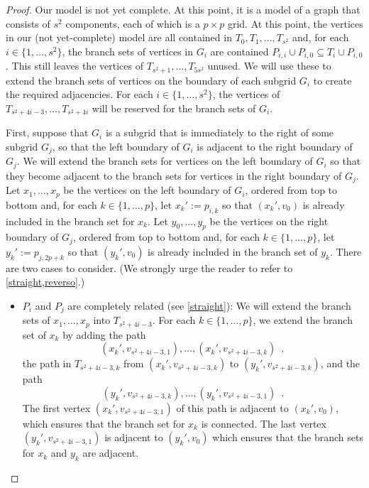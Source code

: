 \documentclass{patmorin}
\theoremstyle{plain}
\theoremstyle{definition}
\begin{document}
\begin{proof}
  Our model is not yet complete.  At this point, it is a model of a graph that consists of $s^2$ components, each of which is a $p\times p$ grid.  At this point, the vertices in our (not yet-complete) model are all contained in $T_0,T_1,\ldots,T_{s^2}$ and, for each $i\in\{1,\ldots,s^2\}$, the branch sets of vertices in $G_i$ are contained $P_{i,i}\cup P_{i,0}\subseteq T_{i}\cup P_{i,0}$.  This still leaves the vertices of $T_{s^2+1},\ldots,T_{5s^2}$ unused.  We will use these to extend the branch sets of vertices on the boundary of each subgrid $G_i$ to create the required adjacencies.  For each $i\in\{1,\ldots,s^2\}$, the vertices of $T_{s^2+4i-3},\ldots,T_{s^2+4i}$ will be reserved for the branch sets of $G_i$.

  First, suppose that $G_i$ is a subgrid that is immediately to the right of some subgrid $G_j$, so that the left boundary of $G_i$ is adjacent to the right boundary of $G_j$.  We will extend the branch sets for vertices on the left boundary of $G_i$ so that they become adjacent to the branch sets for vertices in the right boundary of $G_j$. Let $x_1,\ldots,x_p$ be the vertices on the left boundary of $G_i$, ordered from top to bottom and, for each $k\in\{1,\ldots,p\}$, let $x_k':=p_{i,k}$ so that $(x_k',v_0)$ is already included in the branch set for $x_k$.  Let $y_0,\ldots,y_p$ be the vertices on the right boundary of $G_j$, ordered from top to bottom and, for each $k\in\{1,\ldots,p\}$, let $y_k':=p_{j,2p+k}$ so that $(y_k',v_0)$ is already included in the branch set of $y_k$. There are two cases to consider.  (We strongly urge the reader to refer to \cref{straight,reverso}.)

\newpage

  \begin{itemize}
    \item $P_i$ and $P_j$ are completely related (see \cref{straight}): We will extend the branch sets of $x_1,\ldots,x_p$ into $T_{s^2+4i-3}$.  For each $k\in\{1,\ldots,p\}$, we extend the branch set of $x_k$ by adding the path
    \[
      (x_k',v_{s^2+4i-3,1}),\ldots,(x_k',v_{s^2+4i-3,k}) \enspace ,
    \]
    the path in $T_{s^2+4i-3,k}$ from $(x_k',v_{s^2+4i-3,k})$ to $(y_k',v_{s^2+4i-3,k})$, and the path
    \[
      (y_k',v_{s^2+4i-3,k}),\ldots,(y_k',v_{s^2+4i-3,1}) \enspace .
    \]
    The first vertex $(x_k',v_{s^2+4i-3,1})$ of this path is adjacent to $(x_k',v_0)$, which ensures that the branch set for $x_k$ is connected.  The last vertex $(y_k',v_{s^2+4i-3,1})$ is adjacent to $(y_k',v_0)$ which ensures that the branch sets for $x_k$ and $y_k$ are adjacent.


\end{itemize}
\end{proof}
\end{document}
